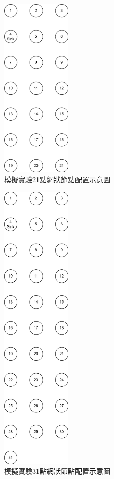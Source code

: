 \begin{ZhChapter}
\begin{figure}[H]
    \centering
    \includegraphics[width = 0.3\textwidth]{image/模擬實驗21點網狀節點配置示意圖.png}
    \caption{模擬實驗21點網狀節點配置示意圖}
    \label{fig: 模擬實驗21點網狀節點配置示意圖}
\end{figure}

\begin{figure}[H]
    \centering
    \includegraphics[width = 0.3\textwidth]{image/模擬實驗31點網狀節點配置示意圖.png}
    \caption{模擬實驗31點網狀節點配置示意圖}
    \label{fig: 模擬實驗31點網狀節點配置示意圖}
\end{figure}


\end{ZhChapter}
